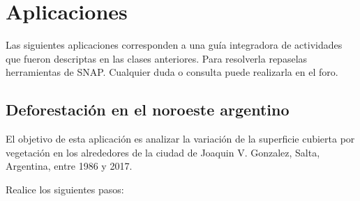 \chapter{Aplicaciones}

Las siguientes aplicaciones corresponden a una guía integradora de actividades que fueron descriptas en las clases anteriores. Para resolverla repaselas herramientas de SNAP.
Cualquier duda o consulta puede realizarla en el foro.

\section{Deforestación en el noroeste argentino}

El objetivo de esta aplicación es analizar la variación de la superficie cubierta por vegetación en los alrededores de la ciudad de Joaquin V. Gonzalez, Salta, Argentina, entre 1986 y 2017.

Realice los siguientes pasos:

